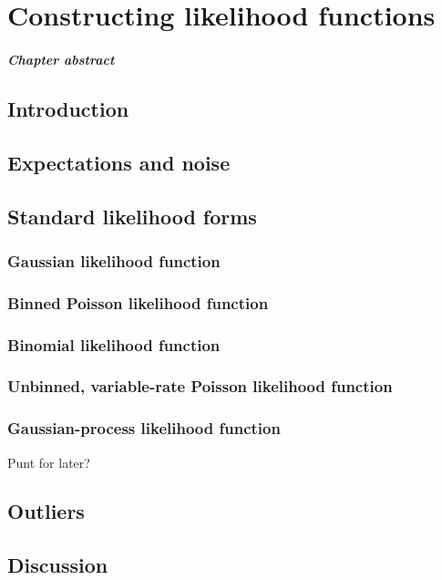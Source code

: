 
\chapter{Constructing likelihood functions}\label{ch:likelihood}
\paragraph{Chapter abstract}

\section{Introduction}

\section{Expectations and noise}

\section{Standard likelihood forms}
\subsection{Gaussian likelihood function}

\subsection{Binned Poisson likelihood function}

\subsection{Binomial likelihood function}

\subsection{Unbinned, variable-rate Poisson likelihood function}

\subsection{Gaussian-process likelihood function}
Punt for later?

\section{Outliers}

\section{Discussion}
